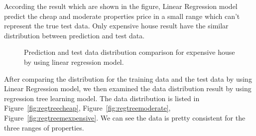 \documentclass[11pt,a4paper]{article}
\begin{document}
According the result which are shown in the figure, Linear Regression model predict the cheap and moderate properties price in a small range which can't represent the true test data. Only expensive house result have the similar distribution between prediction and test data.

\begin{figure}[h]
    \centering
    \hfill%
    \caption{Prediction and test data distribution comparison for expensive house by using linear regression model.}
    \label{fig:linearexpensive}
\end{figure}


\FloatBarrier
After comparing the distribution for the training data and the test data by using Linear Regression model, we then examined the data distribution result by using regression tree learning model. The data distribution is listed in Figure~\ref{fig:regtreecheap}, Figure~\ref{fig:regtreemoderate}, Figure~\ref{fig:regtreemexpensive}. We can see the data is pretty consistent for the three ranges of properties. 
\end{document}
